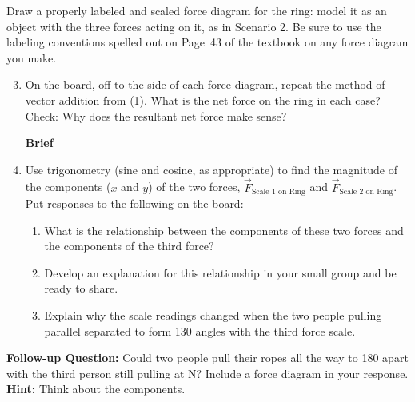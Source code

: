 \begin{enumerate}
	Draw a properly labeled and scaled force diagram for the ring: model it as an object with the three forces acting on it, as in Scenario 2. Be sure to use the labeling conventions spelled out on Page~43 of the textbook on any force diagram you make.
\end{enumerate}\begin{enumerate}\setcounter{enumi}{2}
	\item On the board, off to the side of each force diagram, repeat the method of vector addition from (1). What is the net force on the ring in each case? Check: Why does the resultant net force make sense?

\vspace{12pt}
\hspace{-\textwidth}\hspace{\linewidth} \textbf{Brief}
\hspace{\textwidth}\hspace{-\linewidth}
\WCD
	
	\item Use trigonometry (sine and cosine, as appropriate) to find the magnitude of the components ($x$ and $y$) of the two forces, $\vec{F}_\text{Scale 1 on Ring}$ and $\vec{F}_\text{Scale 2 on Ring}$. Put responses to the following on the board:
	\begin{enumerate}
		\item What is the relationship between the components of these two forces and the components of the third force?
		
		\item Develop an explanation for this relationship in your small group and be ready to share.
		
		\item Explain why the scale readings changed when the two people pulling parallel separated to form 130\textdegree{} angles with the third force scale.
	\end{enumerate}
\end{enumerate}

\WCD
\vspace{12pt}

\noindent \textbf{Follow-up Question:} Could two people pull their ropes all the way to 180\textdegree{} apart with the third person still pulling at \unit[30]{N}? Include a force diagram in your response. \textbf{Hint:} Think about the components.
 
\vspace{12pt}
\WCD
